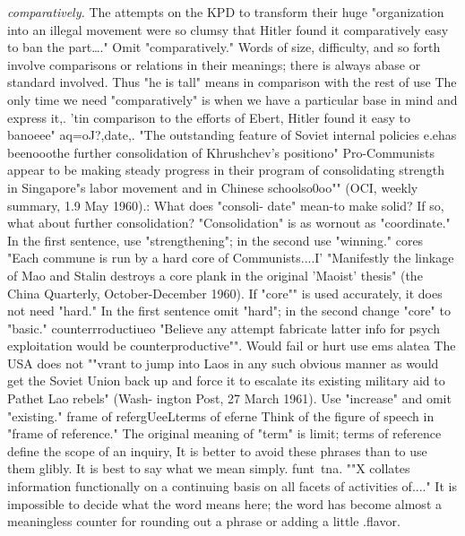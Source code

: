 \documentclass[
    oneside,
    11pt,
    draft
]{memoir}
\begin{document}
\emph{comparatively.} The attempts on the KPD to transform their huge "organization into an illegal movement were so clumsy that Hitler found it comparatively easy to ban the part\dots." Omit "comparatively." Words of size, difficulty, and so forth involve comparisons or relations in their meanings; there is always abase or standard involved. Thus "he is tall" means in comparison with the rest of use The only time we need "comparatively" is when we have a particular base in mind and express it,. 'tin comparison to the efforts of Ebert, Hitler found it easy to banoeee" aq=oJ?,date,. "The outstanding feature of Soviet internal policies e.ehas beenooothe further consolidation of Khrushchev's positiono" Pro-Communists appear to be making steady progress in their program of consolidating strength in Singapore"s labor movement and in Chinese schoolso0oo"" (OCI, weekly summary, 1.9 May 1960).: What does "consoli- date" mean-to make solid? If so, what about further consolidation? "Consolidation" is as wornout as "coordinate." In the first sentence, use "strengthening"; in the second use "winning." cores "Each commune is run by a hard core of Communists....I' "Manifestly the linkage of Mao and Stalin destroys a core plank in the original 'Maoist' thesis" (the China Quarterly, October-December 1960). If "core"" is used accurately, it does not need "hard." In the first sentence omit "hard"; in the second change "core" to "basic." counterrroductiueo "Believe any attempt fabricate latter info for psych exploitation would be counterproductive"". Would fail or hurt use ems alatea The USA does not ""vrant to jump into Laos in any such obvious manner as would get the Soviet Union back up and force it to escalate its existing military aid to Pathet Lao rebels" (Wash- ington Post, 27 March 1961). Use "increase" and omit "existing." frame of refergUeeLterms of eferne Think of the figure of speech in "frame of reference." The original meaning of "term" is limit; terms of reference define the scope of an inquiry, It is better to avoid these phrases than to use them glibly. It is best to say what we mean simply. funt~tna. ""X collates information functionally on a continuing basis on all facets of activities of...." It is impossible to decide what the word means here; the word has become almost a meaningless counter for rounding out a phrase or adding a little .flavor.
\end{document}
